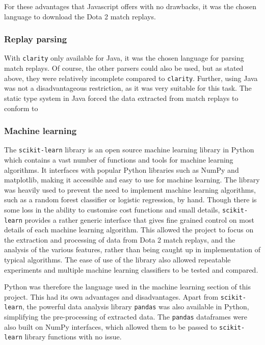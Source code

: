 \documentclass[Report.tex]{subfiles}
\begin{document}
For these advantages that Javascript offers with no drawbacks, it was the chosen language to download the Dota 2 match replays. 

\subsubsection{Replay parsing}
With \texttt{clarity} only available for Java, it was the chosen language for parsing match replays. Of course, the other parsers could also be used, but as stated above, they were relatively incomplete compared to \texttt{clarity}. Further, using Java was not a disadvantageous restriction, as it was very suitable for this task. The static type system in Java forced the data extracted from match replays to conform to 



\subsubsection{Machine learning}
The \texttt{scikit-learn} library \cite{sklearn} is an open source machine learning library in Python which contains a vast number of functions and tools for machine learning algorithms. It interfaces with popular Python libraries such as NumPy and matplotlib, making it accessible and easy to use for machine learning. The library was heavily used to prevent the need to implement machine learning algorithms, such as a random forest classifier or logistic regression, by hand. Though there is some loss in the ability to customise cost functions and small details, \texttt{scikit-learn} provides a rather generic interface that gives fine grained control on most details of each machine learning algorithm. This allowed the project to focus on the extraction and processing of data from Dota 2 match replays, and the analysis of the various features, rather than being caught up in implementation of typical algorithms. The ease of use of the library also allowed repeatable experiments and multiple machine learning classifiers to be tested and compared.

Python was therefore the language used in the machine learning section of this project. This had its own advantages and disadvantages. Apart from \texttt{scikit-learn}, the powerful data analysis library \texttt{pandas} \cite{pandas} was also available in Python, simplifying the pre-processing of extracted data. The \texttt{pandas} dataframes were also built on NumPy interfaces, which allowed them to be passed to \texttt{scikit-learn} library functions with no issue. 
\end{document}
